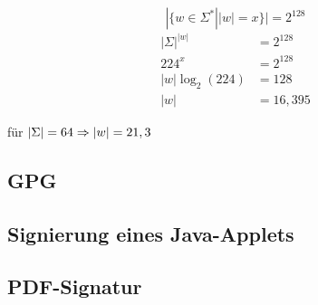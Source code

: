 	\[ | \{ w \in \Sigma^* | |w| = x \} | = 2^{128} \]
\begin{align}
		|\Sigma|^|w| &= 2^{128} \\ 
		224^x        &= 2^{128} \\
		|w|\log_2(224) &= 128 \\
		|w|            &=  16,395
\end{align}	

für $|\Sigma| = 64 \Rightarrow |w| = 21,3 $


\subsection{GPG}
\subsection{Signierung eines Java-Applets}
\subsection{PDF-Signatur}

